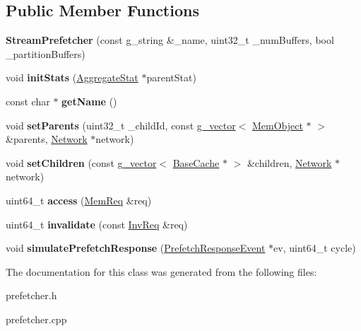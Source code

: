 \subsection*{Public Member Functions}
\begin{DoxyCompactItemize}
\item 
\hypertarget{classStreamPrefetcher_a7456b6d9da6bb4ac1b726aeb88ec5a93}{{\bfseries Stream\-Prefetcher} (const g\-\_\-string \&\-\_\-name, uint32\-\_\-t \-\_\-num\-Buffers, bool \-\_\-partition\-Buffers)}\label{classStreamPrefetcher_a7456b6d9da6bb4ac1b726aeb88ec5a93}

\item 
\hypertarget{classStreamPrefetcher_ad0a16eed87db01ffcbc42a45824e65fb}{void {\bfseries init\-Stats} (\hyperlink{classAggregateStat}{Aggregate\-Stat} $\ast$parent\-Stat)}\label{classStreamPrefetcher_ad0a16eed87db01ffcbc42a45824e65fb}

\item 
\hypertarget{classStreamPrefetcher_a521ea99034db4504d9a19df50394a885}{const char $\ast$ {\bfseries get\-Name} ()}\label{classStreamPrefetcher_a521ea99034db4504d9a19df50394a885}

\item 
\hypertarget{classStreamPrefetcher_a662f4df26d0af098250b021c4fb69ebf}{void {\bfseries set\-Parents} (uint32\-\_\-t \-\_\-child\-Id, const \hyperlink{classg__vector}{g\-\_\-vector}$<$ \hyperlink{classMemObject}{Mem\-Object} $\ast$ $>$ \&parents, \hyperlink{classNetwork}{Network} $\ast$network)}\label{classStreamPrefetcher_a662f4df26d0af098250b021c4fb69ebf}

\item 
\hypertarget{classStreamPrefetcher_a4480f864cc0e916041f3aba6a2e38be9}{void {\bfseries set\-Children} (const \hyperlink{classg__vector}{g\-\_\-vector}$<$ \hyperlink{classBaseCache}{Base\-Cache} $\ast$ $>$ \&children, \hyperlink{classNetwork}{Network} $\ast$network)}\label{classStreamPrefetcher_a4480f864cc0e916041f3aba6a2e38be9}

\item 
\hypertarget{classStreamPrefetcher_a0e2d09fc748974655cdd3b23591d0f9b}{uint64\-\_\-t {\bfseries access} (\hyperlink{structMemReq}{Mem\-Req} \&req)}\label{classStreamPrefetcher_a0e2d09fc748974655cdd3b23591d0f9b}

\item 
\hypertarget{classStreamPrefetcher_a7c1cce2c7be8f10bec474b943765da71}{uint64\-\_\-t {\bfseries invalidate} (const \hyperlink{structInvReq}{Inv\-Req} \&req)}\label{classStreamPrefetcher_a7c1cce2c7be8f10bec474b943765da71}

\item 
\hypertarget{classStreamPrefetcher_ab297aec9a7706566d03203b20a617f39}{void {\bfseries simulate\-Prefetch\-Response} (\hyperlink{classPrefetchResponseEvent}{Prefetch\-Response\-Event} $\ast$ev, uint64\-\_\-t cycle)}\label{classStreamPrefetcher_ab297aec9a7706566d03203b20a617f39}

\end{DoxyCompactItemize}


The documentation for this class was generated from the following files\-:\begin{DoxyCompactItemize}
\item 
prefetcher.\-h\item 
prefetcher.\-cpp\end{DoxyCompactItemize}
